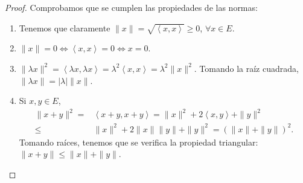 \begin{proof}
Comprobamos que se cumplen las propiedades de las normas:
\begin{enumerate}
\item Tenemos que claramente $\displaystyle \|x\| = \sqrt{\left\langle x, x \right\rangle } \geq 0 $, $\displaystyle \forall x \in E $.
\item $\displaystyle \|x\| = 0 \iff \left\langle x, x \right\rangle = 0 \iff x = 0$.
\item $\displaystyle \|\lambda x\|^{2} = \left\langle \lambda x, \lambda x \right\rangle = \lambda ^{2} \left\langle x, x \right\rangle = \lambda ^{2} \|x\|^{2} $. Tomando la raíz cuadrada, $\displaystyle \|\lambda x\| = \left|\lambda \right|\|x\| $.
\item Si $\displaystyle x,y \in E $,
	\[
	\begin{split}
		\|x + y \|^{2} = & \left\langle x + y, x+y \right\rangle = \|x\|^{2} + 2\left\langle x, y \right\rangle + \|y\|^{2}\\
		\leq & \|x\|^{2} + 2\|x\|\|y\| + \|y\|^{2} = \left(\|x\| + \|y\|\right)^{2}.
	\end{split}
	\]
	Tomando raíces, tenemos que se verifica la propiedad triangular: $\displaystyle \|x + y\| \leq \|x\| + \|y\| $.
\end{enumerate}
\end{proof}
